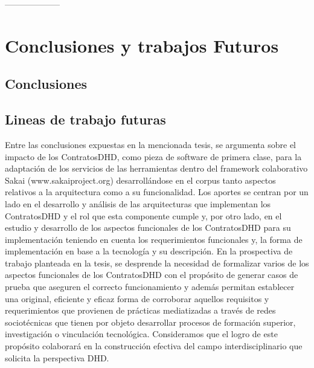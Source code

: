 --------------------
\chapter{Conclusiones y trabajos Futuros} \label{cap:conclusiones}

\section{Conclusiones}

\section{Lineas de trabajo futuras}

Entre las conclusiones expuestas en la mencionada tesis, se argumenta sobre el
impacto de los ContratosDHD, como pieza de software de primera clase, para la
adaptación de los servicios de las herramientas dentro del framework
colaborativo Sakai (www.sakaiproject.org) desarrollándose en el corpus tanto
aspectos relativos a la arquitectura como a su funcionalidad. Los aportes se
centran por un lado en el desarrollo y análisis de las arquitecturas que
implementan los ContratosDHD y el rol que esta componente cumple y, por otro
lado, en el estudio y desarrollo de los aspectos funcionales de los ContratosDHD
para su implementación teniendo en cuenta los requerimientos funcionales y, la
forma de implementación en base a la tecnología y su descripción. 
En la prospectiva de trabajo planteada en la tesis, se desprende la necesidad de
formalizar varios de los aspectos funcionales de los ContratosDHD con el
propósito de generar casos de prueba que aseguren el correcto funcionamiento y
además permitan establecer una original, eficiente y eficaz forma de corroborar 
aquellos requisitos y requerimientos que provienen de prácticas mediatizadas a
través de redes sociotécnicas que tienen por objeto desarrollar procesos de
formación superior, investigación o vinculación tecnológica. Consideramos que el
logro de este propósito colaborará en la construcción efectiva del campo
interdisciplinario que solicita la perspectiva DHD.


